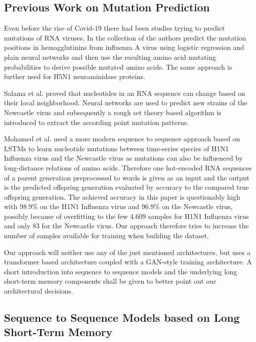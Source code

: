 \subsection{Previous Work on Mutation Prediction} \label{fundamentalsD}

Even before the rise of Covid-19 there had been studies trying to predict mutations of \ac{RNA} viruses. In the collection of \cite{Yan2007, Wu2007, Wu2008} the authors predict the mutation positions in hemagglutinins from influenza A virus using logistic regression and plain neural networks and then use the resulting amino acid mutating probabilities to derive possible mutated amino acids. The same approach is further used for H5N1 neuraminidase proteins. 

Salama et al. \cite{Salama2016} proved that nucleotides in an \ac{RNA} sequence can change based on their local neighborhood. Neural networks are used to predict new strains of the Newcastle virus and subsequently a rough set theory based algorithm is introduced to extract the according point mutation patterns. 

Mohamed et al. \cite{Mohamed2021} used a more modern sequence to sequence approach based on \acp{LSTM} to learn nucleotide mutations between time-series species of H1N1 Influenza virus and the Newcastle virus as mutations can also be influenced by long-distance relations of amino acids. Therefore one hot-encoded \ac{RNA} sequences of a parent generation preprocessed to words is given as an input and the output is the predicted offspring generation evaluated by accuracy to the compared true offspring generation. The achieved accuracy in this paper is questionably high with 98.9\% on the H1N1 Influenza virus and 96.9\% on the Newcastle virus, possibly because of overfitting to the few 4.609 samples for H1N1 Influenza virus and only 83 for the Newcastle virus. Our approach therefore tries to increase the number of samples available for training when building the dataset. 

\vspace{0.5cm}
Our approach will neither use any of the just mentioned architectures, but uses a transformer based architecture coupled with a GAN-style training architecture. A short introduction into sequence to sequence models and the underlying long short-term memory components shall be given to better point out our architectural decisions. 

\subsection{Sequence to Sequence Models based on Long Short-Term Memory} \label{fundamentalsE}

